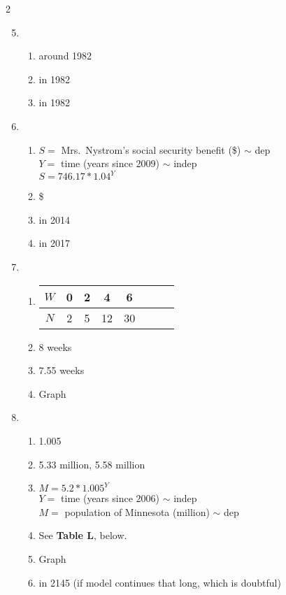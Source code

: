 \begin{multicols} {2}
\begin{enumerate}
\setcounter{enumi}{4}

\item %
\begin{enumerate}
\item around 1982
\item in 1982
\item in 1982
\end{enumerate}

\item %
\begin{enumerate}
\item $S =$ Mrs.\ Nystrom's social security benefit (\$) $\sim$ dep \\ $Y=$ time (years since 2009) $\sim$ indep \\ $S=746.17 \ast 1.04^Y$
\item \$
\item in 2014
\item in 2017
\end{enumerate}

\item %
\begin{enumerate}
\item \begin{tabular} {|c| |c|c |c|c |c|c |c|}\hline
$W$ & 0 & 2 & 4 & 6\\ \hline
$N$ & 2 & 5 & 12 & 30  \\ \hline
\end{tabular}
\item 8 weeks
\item 7.55 weeks
\item Graph
\end{enumerate}

\item %
\begin{enumerate}
\item 1.005
\item 5.33 million, 5.58 million
\item $M=5.2 \ast 1.005^Y$ \\ $Y =$ time (years since 2006) $\sim$ indep \\ $M=$ population of Minnesota (million) $\sim$ dep
\item See \textbf{Table L}, below.
\item Graph
\item in 2145 (if model continues that long, which is doubtful)
\end{enumerate}


\end{enumerate}
\end{multicols}
